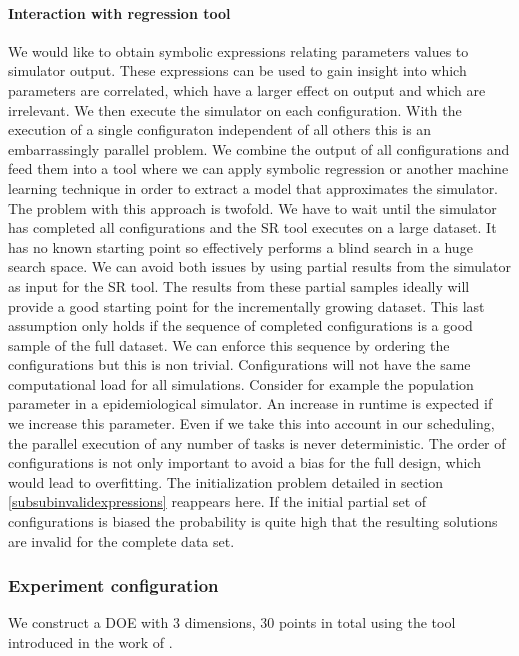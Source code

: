 \paragraph{Interaction with regression tool}
We would like to obtain symbolic expressions relating parameters values to simulator output. These expressions can be used to gain insight into which parameters are correlated, which have a larger effect on output and which are irrelevant. 
We then execute the simulator on each configuration. With the execution of a single configuraton independent of all others this is an embarrassingly parallel problem. We combine the output of all configurations and feed them into a tool where we can apply symbolic regression or another machine learning technique in order to extract a model that approximates the simulator. The problem with this approach is twofold. We have to wait until the simulator has completed all configurations and the SR tool executes on a large dataset. It has no known starting point so effectively performs a blind search in a huge search space. We can avoid both issues by using partial results from the simulator as input for the SR tool. The results from these partial samples ideally will provide a good starting point for the incrementally growing dataset. This last assumption only holds if the sequence of completed configurations is a good sample of the full dataset. We can enforce this sequence by ordering the configurations but this is non trivial. Configurations will not have the same computational load for all simulations. Consider for example the population parameter in a epidemiological simulator. An increase in runtime is expected if we increase this parameter. Even if we take this into account in our scheduling, the parallel execution of any number of tasks is never deterministic. The order of configurations is not only important to avoid a bias for the full design, which would lead to overfitting. The initialization problem detailed in section \ref{subsubinvalidexpressions} reappears here. If the initial partial set of configurations is biased the probability is quite high that the resulting solutions are invalid for the complete data set. 

\subsubsection{Experiment configuration}
We construct a DOE with 3 dimensions, 30 points in total using the tool introduced in the work of \citep{DOE}. 
